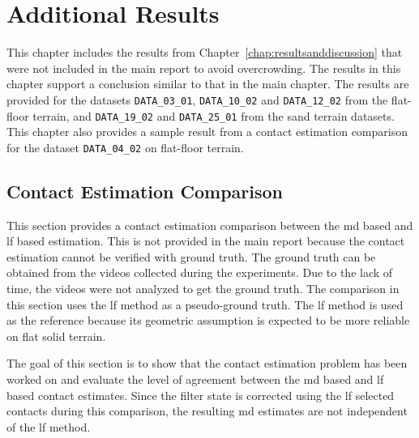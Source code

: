 \documentclass[report.tex]{subfiles}
\begin{document}
    \chapter{Additional Results} \label{chap:additionalResultsAppendix}
    
    This chapter includes the results from Chapter~\ref{chap:resultsanddiscussion} that were not included in the main report to avoid overcrowding. The results in this chapter support a conclusion similar to that in the main chapter. The results are provided for the datasets \texttt{DATA\_03\_01}, \texttt{DATA\_10\_02} and \texttt{DATA\_12\_02} from the flat-floor terrain, and \texttt{DATA\_19\_02} and \texttt{DATA\_25\_01} from the sand terrain datasets. This chapter also provides a sample result from a contact estimation comparison for the dataset \texttt{DATA\_04\_02} on flat-floor terrain.
    
    \section{Contact Estimation Comparison} \label{sec:contactEstimationComparison}
    
    This section provides a contact estimation comparison between the \gls{md} based and \gls{lf} based estimation. This is not provided in the main report because the contact estimation cannot be verified with ground truth. The ground truth can be obtained from the videos collected during the experiments. Due to the lack of time, the videos were not analyzed to get the ground truth. The comparison in this section uses the \gls{lf} method as a pseudo-ground truth. The \gls{lf} method is used as the reference because its geometric assumption is expected to be more reliable on flat solid terrain. 
    
    The goal of this section is to show that the contact estimation problem has been worked on and evaluate the level of agreement between the \gls{md} based and \gls{lf} based contact estimates. Since the filter state is corrected using the \gls{lf} selected contacts during this comparison, the resulting \gls{md} estimates are not independent of the \gls{lf} method.
    
\end{document}

